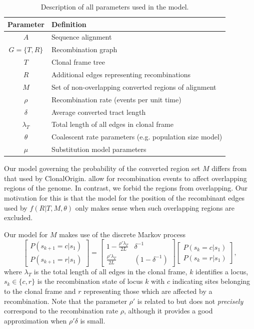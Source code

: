 \documentclass[a4paper,10pt]{article}
\begin{document}
\begin{table}[t]
\begin{tabular}{|cl|}
  \hline
  Parameter & Definition \\
  \hline
  $A$ & Sequence alignment \\
  $G=\{T,R\}$ & Recombination graph \\
  $T$ & Clonal frame tree \\
  $R$ & Additional edges representing recombinations \\
  $M$ & Set of non-overlapping converted regions of alignment \\
  $\rho$ & Recombination rate (events per unit time) \\
  $\delta$ & Average converted tract length \\
  $\lambda_T$ & Total length of all edges in clonal frame \\
  $\theta$ & Coalescent rate parameters (e.g. population size model) \\
  $\mu$ & Substitution model parameters \\
  \hline
\end{tabular}
\caption{Description of all parameters used in the model.}
\end{table}


Our model governing the probability of the converted region set $M$
differs from that used by ClonalOrigin. \cite{Didelot2010} allow for
recombination events to affect overlapping regions of the genome.  In
contrast, we forbid the regions from overlapping. Our motivation for
this is that the model for the position of the recombinant edges used
by $f(R|T,M,\theta)$ only makes sense when such overlapping regions
are excluded.

Our model for $M$ makes use of the discrete Markov process
\begin{equation}
\begin{bmatrix}
P(s_{k+1}=c|s_1) \\
P(s_{k+1}=r|s_1)
\end{bmatrix}
=
\begin{bmatrix}
1-\frac{\rho' \lambda_T}{2L} & \delta^{-1} \\
\frac{\rho' \lambda_T}{2L} & (1-\delta^{-1})
\end{bmatrix}
\begin{bmatrix}
P(s_{k}=c|s_1) \\
P(s_{k}=r|s_1)
\end{bmatrix},
\end{equation}
where $\lambda_T$ is the total length of all edges in the clonal
frame, $k$ identifies a locus, $s_k\in\{c,r\}$ is the recombination
state of locus $k$ with $c$ indicating sites belonging to the clonal
frame and $r$ representing those which are affected by a
recombination.  Note that the parameter $\rho'$ is related to but does
not \emph{precisely} correspond to the recombination rate $\rho$,
although it provides a good approximation when $\rho'\delta$ is small.
\end{document}
